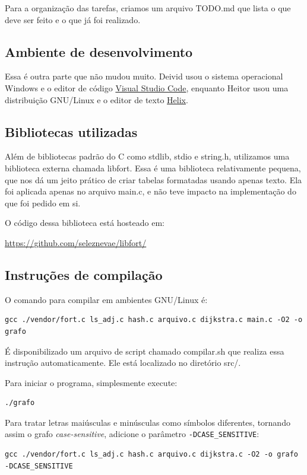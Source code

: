 \documentclass[a4paper, 12pt]{article}
\begin{document}
Para a organização das tarefas, criamos um arquivo TODO.md que lista o que deve ser feito
e o que já foi realizado.

\subsection{Ambiente de desenvolvimento}
Essa é outra parte que não mudou muito. Deivid usou o sistema operacional Windows
e o editor de código \href{https://code.visualstudio.com/}{Visual Studio Code},
enquanto Heitor usou uma distribuição GNU/Linux e o editor de texto \href{https://helix-editor.com}
{Helix}.

\subsection{Bibliotecas utilizadas}
Além de bibliotecas padrão do C como stdlib, stdio e string.h, utilizamos uma
biblioteca externa chamada libfort.
Essa é uma biblioteca relativamente pequena, que nos dá um jeito prático de criar
tabelas formatadas usando apenas texto. Ela foi aplicada apenas no arquivo main.c,
e não teve impacto na implementação do que foi pedido em si.

O código dessa biblioteca está hosteado em:

\url{https://github.com/seleznevae/libfort/}

\subsection{Instruções de compilação}
\label{comp}
O comando para compilar em ambientes GNU/Linux é: \\
\begin{lstlisting}[breaklines=true]
gcc ./vendor/fort.c ls_adj.c hash.c arquivo.c dijkstra.c main.c -O2 -o grafo
\end{lstlisting}

É disponibilizado um arquivo de script chamado compilar.sh que realiza essa
instrução automaticamente. Ele está localizado no diretório src/.

Para iniciar o programa, simplesmente execute: \\
\begin{lstlisting}
./grafo
\end{lstlisting}

Para tratar letras maiúsculas e minúsculas como símbolos diferentes, tornando
assim o grafo \textit{case-sensitive}, adicione o parâmetro \lstinline|-DCASE_SENSITIVE|:
\begin{lstlisting}[breaklines=true]
gcc ./vendor/fort.c ls_adj.c hash.c arquivo.c dijkstra.c -O2 -o grafo -DCASE_SENSITIVE
\end{lstlisting}
\newpage
\end{document}
